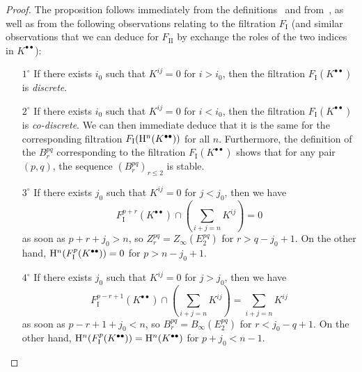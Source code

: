 \begin{proof}
The proposition follows immediately from the definitions~ and from~, as well as from the following observations relating to the filtration $F_\mathrm{I}$ (and similar observations that we can deduce for $F_\mathrm{II}$ by exchange the roles of the two indices in $K^{\bullet\bullet}$):
\begin{enumerate}
  \item[{$1^{\circ}$}] If there exists $i_0$ such that $K^{ij}=0$ for $i>i_0$, then the filtration $F_\mathrm{I}(K^{\bullet\bullet})$ is \emph{discrete}.
  \item[{$2^{\circ}$}] If there exists $i_0$ such that $K^{ij}=0$ for $i<i_0$, then the filtration $F_\mathrm{I}(K^{\bullet\bullet})$ is \emph{co-discrete}.
    We can then immediate deduce that it is the same for the corresponding filtration $F_\mathrm{I}(\mathrm{H}^n(K^{\bullet\bullet}))$ for all $n$. 
    Furthermore, the definition of the $B_{r}^{pq}$ corresponding to the filtration $F_\mathrm{I}(K^{\bullet\bullet})$  shows that for any pair $(p,q)$, the sequence $(B_{r}^{pq})_{r\leq{2}}$ is stable.
  \item[{$3^{\circ}$}] If there exists $j_0$ such that $K^{ij}=0$ for $j<j_0$, then we have 
    \[
      F_\mathrm{I}^{p+r}(K^{\bullet\bullet})
      \cap (\sum_{i+j=n}K^{ij})
      = 0
    \]
    as soon as $p+r+j_{0}>n$, so $Z_{r}^{pq} = Z_\infty(E_2^{pq})$ for $r>q-j_{0}+1$.
    On the other hand, $\mathrm{H}^{n}(F_\mathrm{I}^{p}(K^{\bullet\bullet})) = 0$ for $p>n-j_{0}+1$.
  \item[{$4^{\circ}$}] If there exists $j_0$ such that $K^{ij}=0$ for $j>j_0$, then we have 
    \[
      F_\mathrm{I}^{p-r+1}(K^{\bullet\bullet})
      \cap (\sum_{i+j=n}K^{ij})
      = \sum_{i+j=n}K^{ij}
    \]
    as soon as $p-r+1+j_{0}<n$, so $B_{r}^{pq} = B_\infty(E_2^{pq})$ for $r<j_{0}-q+1$.
    On the other hand, $\mathrm{H}^{n}(F_\mathrm{I}^{p}(K^{\bullet\bullet})) = \mathrm{H}^{n}(K^{\bullet\bullet})$ for $p+j_{0}<n-1$.
\end{enumerate}
\end{proof}

